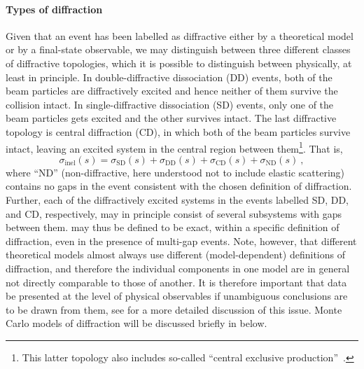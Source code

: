 \paragraph{Types of diffraction}
Given that an event has been labelled as diffractive either by a
theoretical model or by a final-state observable, we may distinguish
between three different classes of diffractive topologies, which it is
possible to distinguish between physically, at least in principle. 
In double-diffractive dissociation (DD) events, both of the beam particles are
diffractively excited and hence neither of them survive the collision
intact. In single-diffractive dissociation (SD) events, only one of the beam
particles gets excited and the other survives intact. The last 
diffractive topology is  central diffraction (CD),  in which 
both of the beam particles survive intact, leaving an excited system
in the central region between them\footnote{This latter topology also includes
so-called ``central exclusive production''~\cite{Khoze:2001xm}.}.
That is, 
\begin{equation}
\sigma_{\mathrm{inel}}(s) = 
\sigma_{\mathrm{SD} }(s)
+
\sigma_{\mathrm{DD}}(s) +
\sigma_{\mathrm{CD}}(s) + 
\sigma_{\mathrm{ND}}(s) ~, \label{eq:diff}
\end{equation}
where ``ND'' (non-diffractive, here understood not to include elastic
scattering) contains no gaps in the event
consistent with the chosen definition of diffraction. Further, 
each of the diffractively excited systems in the events labelled SD,
DD, and CD, respectively, may in principle consist of
several subsystems with gaps between them.  may 
thus be defined to be exact, within a specific definition of
diffraction, even in the presence of multi-gap events. 
Note, however, that different
theoretical models almost always use different (model-dependent) definitions of
diffraction, and therefore the individual components in one model are
in general not directly comparable to those of another. It is
therefore important that data be presented at the level of physical
observables if unambiguous conclusions are to be drawn from them, see
 for a more detailed discussion of this issue.
Monte Carlo models of diffraction will be discussed briefly in
 below.

